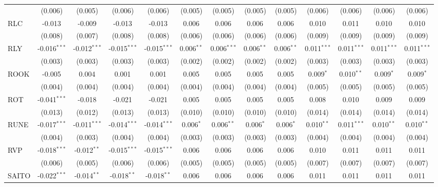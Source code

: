 \begin{table}[!htbp]
\begin{tabular}{@{\extracolsep{5pt}}lcccccccccccc}
  & (0.006) & (0.005) & (0.006) & (0.006) & (0.005) & (0.005) & (0.005) & (0.005) & (0.006) & (0.006) & (0.006) & (0.006) \\
 RLC & -0.013$^{}$ & -0.009$^{}$ & -0.013$^{}$ & -0.013$^{}$ & 0.006$^{}$ & 0.006$^{}$ & 0.006$^{}$ & 0.006$^{}$ & 0.010$^{}$ & 0.011$^{}$ & 0.010$^{}$ & 0.010$^{}$ \\
  & (0.008) & (0.007) & (0.008) & (0.008) & (0.006) & (0.006) & (0.006) & (0.006) & (0.009) & (0.009) & (0.009) & (0.009) \\
 RLY & -0.016$^{***}$ & -0.012$^{***}$ & -0.015$^{***}$ & -0.015$^{***}$ & 0.006$^{**}$ & 0.006$^{***}$ & 0.006$^{**}$ & 0.006$^{**}$ & 0.011$^{***}$ & 0.011$^{***}$ & 0.011$^{***}$ & 0.011$^{***}$ \\
  & (0.003) & (0.003) & (0.003) & (0.003) & (0.002) & (0.002) & (0.002) & (0.002) & (0.003) & (0.003) & (0.003) & (0.003) \\
 ROOK & -0.005$^{}$ & 0.004$^{}$ & 0.001$^{}$ & 0.001$^{}$ & 0.005$^{}$ & 0.005$^{}$ & 0.005$^{}$ & 0.005$^{}$ & 0.009$^{*}$ & 0.010$^{**}$ & 0.009$^{*}$ & 0.009$^{*}$ \\
  & (0.004) & (0.004) & (0.004) & (0.004) & (0.004) & (0.004) & (0.004) & (0.004) & (0.005) & (0.005) & (0.005) & (0.005) \\
 ROT & -0.041$^{***}$ & -0.018$^{}$ & -0.021$^{}$ & -0.021$^{}$ & 0.005$^{}$ & 0.005$^{}$ & 0.005$^{}$ & 0.005$^{}$ & 0.008$^{}$ & 0.010$^{}$ & 0.009$^{}$ & 0.009$^{}$ \\
  & (0.013) & (0.012) & (0.013) & (0.013) & (0.010) & (0.010) & (0.010) & (0.010) & (0.014) & (0.014) & (0.014) & (0.014) \\
 RUNE & -0.017$^{***}$ & -0.011$^{***}$ & -0.014$^{***}$ & -0.014$^{***}$ & 0.006$^{*}$ & 0.006$^{**}$ & 0.006$^{*}$ & 0.006$^{*}$ & 0.010$^{**}$ & 0.011$^{***}$ & 0.010$^{**}$ & 0.010$^{**}$ \\
  & (0.004) & (0.003) & (0.004) & (0.004) & (0.003) & (0.003) & (0.003) & (0.003) & (0.004) & (0.004) & (0.004) & (0.004) \\
 RVP & -0.018$^{***}$ & -0.012$^{**}$ & -0.015$^{***}$ & -0.015$^{***}$ & 0.006$^{}$ & 0.006$^{}$ & 0.006$^{}$ & 0.006$^{}$ & 0.010$^{}$ & 0.011$^{}$ & 0.011$^{}$ & 0.011$^{}$ \\
  & (0.006) & (0.005) & (0.006) & (0.006) & (0.005) & (0.005) & (0.005) & (0.005) & (0.007) & (0.007) & (0.007) & (0.007) \\
 SAITO & -0.022$^{***}$ & -0.014$^{**}$ & -0.018$^{**}$ & -0.018$^{**}$ & 0.006$^{}$ & 0.006$^{}$ & 0.006$^{}$ & 0.006$^{}$ & 0.011$^{}$ & 0.011$^{}$ & 0.011$^{}$ & 0.011$^{}$ \\

\end{tabular}
\end{table}
